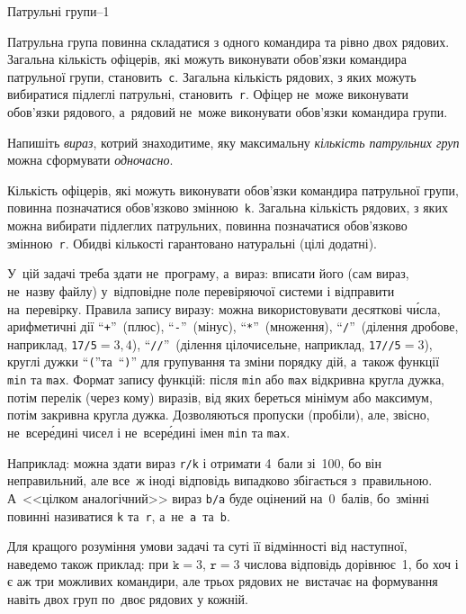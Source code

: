 {

\PrintEjudgeConstraintsfalse

\begin{problemAllDefault}{Патрульні групи--1}
\label{problem:201718-oioi-A-patrol-group-1}

Патрульна група повинна складатися з одного командира та рівно двох рядових. Загальна кількість офіцерів, які можуть виконувати обов'язки командира патрульної групи, становить~\texttt{c}. Загальна кількість рядових, з яких можуть вибиратися підлеглі патрульні, становить~\texttt{r}. Офіцер не~може виконувати обов'язки рядового, а~рядовий не~може виконувати обов'язки командира групи.

Напишіть \emph{вираз}, котрий знаходитиме, яку максимальну \emph{кількість патрульних груп} можна сформувати \emph{одночасно}.

Кількість офіцерів, які можуть виконувати обов'язки командира патрульної групи, повинна позначатися обов'язково змінною~\texttt{k}.
Загальна кількість рядових, з яких можна вибирати підлеглих патрульних, повинна позначатися обов'язково змінною~\texttt{r}.
Обидві кількості гарантовано натуральні (цілі додатні).

У~цій задачі треба здати не~програму, а~вираз: 
вписати його (сам вираз, не~назву файлу) у~відповідне поле перевіряючої системи
і відправити на~перевірку. Правила запису виразу:
можна використовувати десяткові ч\'{и}сла, арифметичні дії ``\verb"+"''~(плюс), 
``\verb"-"''~(мінус), ``\verb"*"''~(множення), ``\verb"/"''~(ділення дробове, наприклад, \verb"17/5"${=}3{,}4$), ``\verb"//"''~(ділення цілочисельне, наприклад, \verb"17//5"${=}3$), круглі дужки ``\verb"("''\nolinebreak[2] та~``\verb")"'' 
для групування та зміни порядку дій, а~також функції \verb"min" та \verb"max".
Формат запису функцій: після \verb"min" або \verb"max" відкривна кругла дужка, потім перелік (через кому) виразів, від яких береться мінімум або максимум, потім закривна кругла дужка.
 Дозволяються пропуски (пробіли), 
але, звісно, не~всер\'{е}дині чисел і не~всер\'{е}дині імен \verb"min" та \verb"max".

Наприклад: можна здати вираз 
\verb"r/k"
і отримати 4~бали зі~100, бо він неправильний, 
але все~ж іноді відповідь випадково збігається з~правильною. 
А~<<цілком аналогічний>> вираз 
\verb"b/a"
буде оцінений на~0~балів, 
бо~змінні повинні називатися \verb"k" та~\verb"r", а~не~\verb"a"~та~\verb"b".

Для кращого розуміння умови задачі та суті її відмінності від наступної, наведемо також приклад: при 
$\texttt{k}{=}3$, 
$\texttt{r}{=}3$
числова відповідь дорівнює~1, бо хоч і є аж три можливих командири, але трьох рядових не~вистачає на формування навіть двох груп по~двоє рядових у кожній.

\end{problemAllDefault}

}